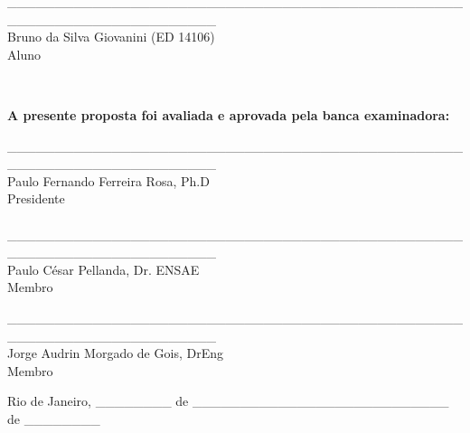 \documentclass[a4paper, 12pt]{article}
\begin{document}
\newpage


 

\newpage

\begin{center}
\_\_\_\_\_\_\_\_\_\_\_\_\_\_\_\_\_\_\_\_\_\_\_\_\_\_\_\_\_\_\_\_\_\_\_\_\_\_\_\_\_\_\_\_\_\_\_\_\_\_\_\_\_\_\_\_\_\_\_\_\_\_\_\_\_\_\_\_\_\_ \\

Bruno da Silva Giovanini (ED 14106) \\Aluno \\ 

\end{center}
 
\hspace{4cm}
\\

\vspace{2cm}

\noindent\textbf{A presente proposta foi avaliada e aprovada pela banca examinadora:}

\hspace{4cm}

\begin{center}
\_\_\_\_\_\_\_\_\_\_\_\_\_\_\_\_\_\_\_\_\_\_\_\_\_\_\_\_\_\_\_\_\_\_\_\_\_\_\_\_\_\_\_\_\_\_\_\_\_\_\_\_\_\_\_\_\_\_\_\_\_\_\_\_\_\_\_\_\_\_ \\
Paulo Fernando Ferreira Rosa, Ph.D \\Presidente \\ 

\hspace{4cm}
\\


\_\_\_\_\_\_\_\_\_\_\_\_\_\_\_\_\_\_\_\_\_\_\_\_\_\_\_\_\_\_\_\_\_\_\_\_\_\_\_\_\_\_\_\_\_\_\_\_\_\_\_\_\_\_\_\_\_\_\_\_\_\_\_\_\_\_\_\_\_\_  \\
Paulo César Pellanda, Dr. ENSAE \\Membro \\

\hspace{4cm}

\_\_\_\_\_\_\_\_\_\_\_\_\_\_\_\_\_\_\_\_\_\_\_\_\_\_\_\_\_\_\_\_\_\_\_\_\_\_\_\_\_\_\_\_\_\_\_\_\_\_\_\_\_\_\_\_\_\_\_\_\_\_\_\_\_\_\_\_\_\_  \\
Jorge Audrin Morgado de Gois, DrEng \\Membro \\

\hspace{4cm}

\vspace{3cm}

Rio de Janeiro, \_\_\_\_\_\_\_\_ de \_\_\_\_\_\_\_\_\_\_\_\_\_\_\_\_\_\_\_\_\_\_\_\_\_\_\_ de \_\_\_\_\_\_\_\_
 
\end{center}
\end{document}
